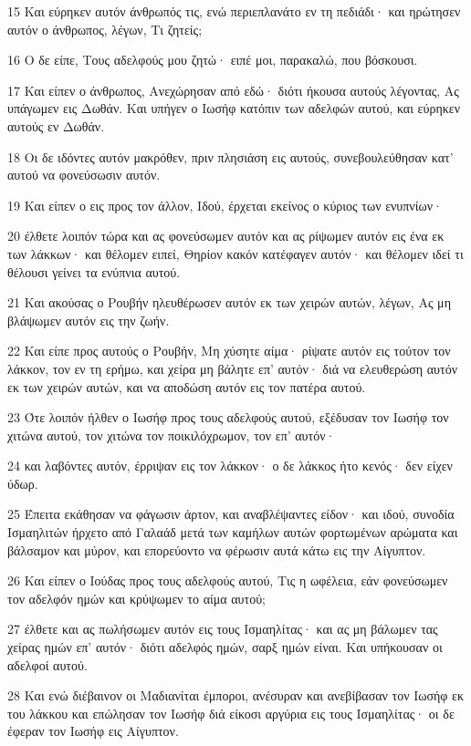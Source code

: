 \par 15 Και εύρηκεν αυτόν άνθρωπός τις, ενώ περιεπλανάτο εν τη πεδιάδι· και ηρώτησεν αυτόν ο άνθρωπος, λέγων, Τι ζητείς;
\par 16 Ο δε είπε, Τους αδελφούς μου ζητώ· ειπέ μοι, παρακαλώ, που βόσκουσι.
\par 17 Και είπεν ο άνθρωπος, Ανεχώρησαν από εδώ· διότι ήκουσα αυτούς λέγοντας, Ας υπάγωμεν εις Δωθάν. Και υπήγεν ο Ιωσήφ κατόπιν των αδελφών αυτού, και εύρηκεν αυτούς εν Δωθάν.
\par 18 Οι δε ιδόντες αυτόν μακρόθεν, πριν πλησιάση εις αυτούς, συνεβουλεύθησαν κατ' αυτού να φονεύσωσιν αυτόν.
\par 19 Και είπεν ο εις προς τον άλλον, Ιδού, έρχεται εκείνος ο κύριος των ενυπνίων·
\par 20 έλθετε λοιπόν τώρα και ας φονεύσωμεν αυτόν και ας ρίψωμεν αυτόν εις ένα εκ των λάκκων· και θέλομεν ειπεί, Θηρίον κακόν κατέφαγεν αυτόν· και θέλομεν ιδεί τι θέλουσι γείνει τα ενύπνια αυτού.
\par 21 Και ακούσας ο Ρουβήν ηλευθέρωσεν αυτόν εκ των χειρών αυτών, λέγων, Ας μη βλάψωμεν αυτόν εις την ζωήν.
\par 22 Και είπε προς αυτούς ο Ρουβήν, Μη χύσητε αίμα· ρίψατε αυτόν εις τούτον τον λάκκον, τον εν τη ερήμω, και χείρα μη βάλητε επ' αυτόν· διά να ελευθερώση αυτόν εκ των χειρών αυτών, και να αποδώση αυτόν εις τον πατέρα αυτού.
\par 23 Ότε λοιπόν ήλθεν ο Ιωσήφ προς τους αδελφούς αυτού, εξέδυσαν τον Ιωσήφ τον χιτώνα αυτού, τον χιτώνα τον ποικιλόχρωμον, τον επ' αυτόν·
\par 24 και λαβόντες αυτόν, έρριψαν εις τον λάκκον· ο δε λάκκος ήτο κενός· δεν είχεν ύδωρ.
\par 25 Έπειτα εκάθησαν να φάγωσιν άρτον, και αναβλέψαντες είδον· και ιδού, συνοδία Ισμαηλιτών ήρχετο από Γαλαάδ μετά των καμήλων αυτών φορτωμένων αρώματα και βάλσαμον και μύρον, και επορεύοντο να φέρωσιν αυτά κάτω εις την Αίγυπτον.
\par 26 Και είπεν ο Ιούδας προς τους αδελφούς αυτού, Τις η ωφέλεια, εάν φονεύσωμεν τον αδελφόν ημών και κρύψωμεν το αίμα αυτού;
\par 27 έλθετε και ας πωλήσωμεν αυτόν εις τους Ισμαηλίτας· και ας μη βάλωμεν τας χείρας ημών επ' αυτόν· διότι αδελφός ημών, σαρξ ημών είναι. Και υπήκουσαν οι αδελφοί αυτού.
\par 28 Και ενώ διέβαινον οι Μαδιανίται έμποροι, ανέσυραν και ανεβίβασαν τον Ιωσήφ εκ του λάκκου και επώλησαν τον Ιωσήφ διά είκοσι αργύρια εις τους Ισμαηλίτας· οι δε έφεραν τον Ιωσήφ εις Αίγυπτον.

